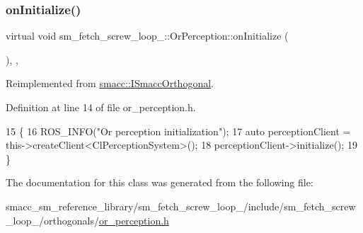 \subsubsection{\texorpdfstring{on\+Initialize()}{onInitialize()}}
{\footnotesize\ttfamily virtual void sm\+\_\+fetch\+\_\+screw\+\_\+loop\+\_\+::\+Or\+Perception\+::on\+Initialize (\begin{DoxyParamCaption}{ }\end{DoxyParamCaption})\hspace{0.3cm}{\ttfamily [inline]}, {\ttfamily [override]}, {\ttfamily [virtual]}}



Reimplemented from \hyperlink{classsmacc_1_1ISmaccOrthogonal_a6bb31c620cb64dd7b8417f8705c79c7a}{smacc\+::\+I\+Smacc\+Orthogonal}.



Definition at line 14 of file or\+\_\+perception.\+h.


\begin{DoxyCode}
15     \{
16         ROS\_INFO(\textcolor{stringliteral}{"Or perception initialization"});
17         \textcolor{keyword}{auto} perceptionClient = this->createClient<ClPerceptionSystem>();
18         perceptionClient->initialize();
19     \}
\end{DoxyCode}


The documentation for this class was generated from the following file\+:\begin{DoxyCompactItemize}
\item 
smacc\+\_\+sm\+\_\+reference\+\_\+library/sm\+\_\+fetch\+\_\+screw\+\_\+loop\+\_/include/sm\+\_\+fetch\+\_\+screw\+\_\+loop\+\_/orthogonals/\hyperlink{sm__fetch__screw__loop__1_2include_2sm__fetch__screw__loop__1_2orthogonals_2or__perception_8h}{or\+\_\+perception.\+h}\end{DoxyCompactItemize}
